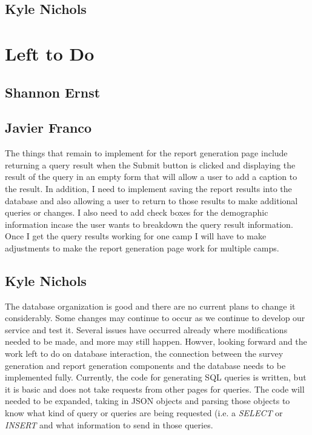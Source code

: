 \documentclass[letterpaper,10pt,serif, draftclsnofoot,onecolumn, compsoc, titlepage]{IEEEtran}
\begin{document}
\subsection{Kyle Nichols}

\section{Left to Do}

\subsection{Shannon Ernst}

\subsection{Javier Franco}
The things that remain to implement for the report generation page include returning a query result when the Submit button is clicked and displaying the result of the query in an empty form that will allow a user to add a caption to the result.  In addition, I need to implement saving the report results into the database and also allowing a user to return to those results to make additional queries or changes. I also need to add check boxes for the demographic information incase the user wants to breakdown the query result information. Once I get the query results working for one camp I will have to make adjustments to make the report generation page work for multiple camps. 

\subsection{Kyle Nichols}
The database organization is good and there are no current plans to change it considerably.
Some changes may continue to occur as we continue to develop our service and test it.
Several issues have occurred already where modifications needed to be made, and more may still happen.
Howver, looking forward and the work left to do on database interaction, the connection between the survey generation and report generation components and the database needs to be implemented fully.
Currently, the code for generating SQL queries is written, but it is basic and does not take requests from other pages for queries.
The code will needed to be expanded, taking in JSON objects and parsing those objects to know what kind of query or queries are being requested (i.e. a \emph{SELECT} or \emph{INSERT} and what information to send in those queries.
\end{document}
